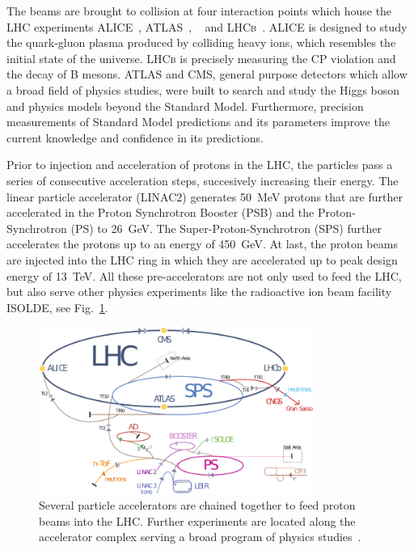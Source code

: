 The beams are brought to collision at four interaction points which house the
LHC experiments ALICE~\cite{ALICE}, ATLAS~\cite{ATLASa},
\CMS~\cite{Bayatian:922757,Ball:2007zza,Chatrchyan:2008aa} and
\textsc{LHCb}~\cite{LHCb}. ALICE is designed to study the quark-gluon plasma
produced by colliding heavy ions, which resembles the initial state of the
universe. \textsc{LHCb} is precisely measuring the CP violation and the decay of B
mesons. ATLAS and CMS, general purpose detectors which allow a broad field of
physics studies, were built to search and study the Higgs boson and physics
models beyond the Standard Model. Furthermore, precision measurements of
Standard Model predictions and its parameters improve the current knowledge and
confidence in its predictions.

Prior to injection and acceleration of protons in the LHC, the particles pass a
series of consecutive acceleration steps, succesively increasing their energy.
The linear particle accelerator (LINAC2) generates \SI{50}{\mega \electronvolt}
protons that are further accelerated in the Proton Synchrotron Booster (PSB) and
the Proton-Synchrotron (PS) to \SI{26}{\giga \electronvolt}. The
Super-Proton-Synchrotron (SPS) further accelerates the protons up to an energy
of \SI{450}{\giga \electronvolt}. At last, the proton beams are injected into
the LHC ring in which they are accelerated up to peak design energy of
\SI{13}{\tera\electronvolt}. All these pre-accelerators are not only used to
feed the LHC, but also serve other physics experiments like the radioactive ion
beam facility ISOLDE, see Fig.~\ref{fig:lhc_complex}.

\begin{figure}[htbp]
    \centering
    \includegraphics[width=0.8\textwidth]{figures/experimental_setup/lhc_accelerator_chain.pdf}
    \caption[\CERN accelerator complex]{Several particle accelerators are
        chained together to feed proton beams into the LHC. Further experiments are
        located along the accelerator complex serving a broad program of physics
        studies~\cite{LHC:COMPLEX}.}
    \label{fig:lhc_complex}
\end{figure}

